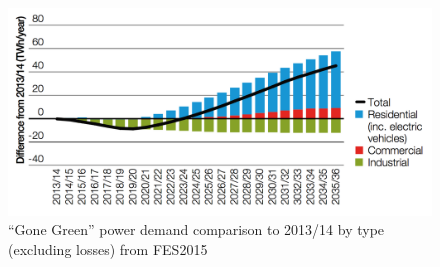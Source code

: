 \begin{figure}\centering
	\includegraphics{_introduction/fig/electricity-demand-change-forecast}
	\caption{``Gone Green'' power demand comparison to 2013/14 by type (excluding losses) from FES2015 \cite{FES2015}}
	\label{ch-introduction:fig:electricity-demand-change-forecast}
\end{figure}